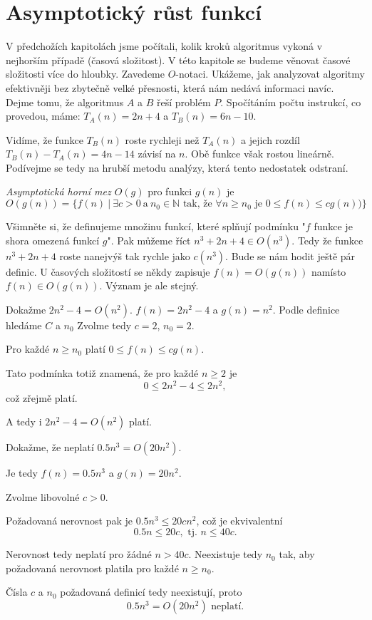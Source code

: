 \documentclass[openany,12pt,a4paper]{book}
\begin{document}
\chapter{Asymptotický růst funkcí}

V předchožích kapitolách jsme počítali, kolik kroků algoritmus vykoná v nejhorším případě (časová složitost). V této kapitole se budeme věnovat časové složitosti více do hloubky. Zavedeme $O$-notaci.
Ukážeme, jak analyzovat algoritmy efektivněji bez zbytečně velké přesnosti, která nám nedává informaci navíc.
Dejme tomu, že algoritmus $A$ a $B$ řeší problém $P$. Spočítáním počtu instrukcí, co provedou, máme:
$T_A(n) = 2n + 4$ a $T_B(n) = 6n - 10$. 

Vidíme, že funkce $T_B(n)$ roste rychleji než $T_A(n)$ a jejich rozdíl $T_B(n) - T_A(n) = 4n - 14$ závisí na $n$. Obě funkce však rostou lineárně.
Podívejme se tedy na hrubší metodu analýzy, která tento nedostatek odstraní.

\begin{definition}
\emph{Asymptotická horní mez $O(g)$} pro funkci $g(n)$ je
\[
O(g(n)) = \{f(n) \ | \ \exists c > 0 \ \text{a} \ n_0 \in \mathbb{N} \text{ tak, že } \forall n \geq n_0 \text{ je } 0 \leq f(n) \leq cg(n))\}
\]
\end{definition}

Všimněte si, že definujeme množinu funkcí, které splňují podmínku "$f$ funkce je shora omezená funkcí $g$".
Pak můžeme říct $n^3 + 2n + 4 \in O(n^3)$. Tedy že funkce $n^3 + 2n + 4$ roste nanejvýš tak rychle jako
$c(n^3)$. Bude se nám hodit ještě pár definic.
U časových složitostí se někdy zapisuje $f(n) = O(g(n))$ namísto $f(n) \in O(g(n))$. Význam je ale stejný.


\begin{example}
Dokažme $2n^2 - 4 = O(n^2)$.
$f(n) = 2n^2 - 4$ a $g(n) = n^2$.
Podle definice hledáme $C$ a $n_0$
Zvolme tedy $c = 2$, $n_0 = 2$.

Pro každé $n \ge n_0$ platí $0 \le f(n) \le c g(n)$.

Tato podmínka totiž znamená, že pro každé $n \ge 2$ je 
$$0 \le 2n^2 - 4 \le 2n^2,$$
což zřejmě platí.

A tedy i $2n^2 - 4 = O(n^2)$ platí.
\end{example}

\newpage
\begin{example}
Dokažme, že neplatí $0.5n^3 = O(20n^2)$.

Je tedy $f(n) = 0.5n^3$ a $g(n) = 20n^2$.

Zvolme libovolné $c > 0$.

Požadovaná nerovnost pak je $0.5n^3 \le 20cn^2$, což je ekvivalentní
$$0.5n \le 20c, \text{ tj. } n \le 40c.$$

Nerovnost tedy neplatí pro žádné $n > 40c$.
Neexistuje tedy $n_0$ tak, aby požadovaná nerovnost platila pro každé $n \ge n_0$.

Čísla $c$ a $n_0$ požadovaná definicí tedy neexistují, proto 
$$0.5n^3 = O(20n^2) \text{ neplatí.}$$
\end{example}
\end{document}
